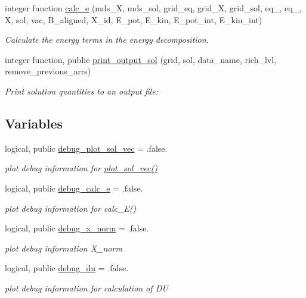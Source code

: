 \begin{DoxyCompactItemize}
integer function \hyperlink{namespacesol__ops_ae094c2a5235324b4aadb53623978d191}{calc\+\_\+e} (mds\+\_\+X, mds\+\_\+sol, grid\+\_\+eq, grid\+\_\+X, grid\+\_\+sol, eq\+\_, eq\+\_, X, sol, vac, B\+\_\+aligned, X\+\_\+id, E\+\_\+pot, E\+\_\+kin, E\+\_\+pot\+\_\+int, E\+\_\+kin\+\_\+int)
\begin{DoxyCompactList}\small\item\em Calculate the energy terms in the energy decomposition. \end{DoxyCompactList}\item 
integer function, public \hyperlink{namespacesol__ops_a06eb95d55da45ff2a1f830a380e0cf80}{print\+\_\+output\+\_\+sol} (grid, sol, data\+\_\+name, rich\+\_\+lvl, remove\+\_\+previous\+\_\+arrs)
\begin{DoxyCompactList}\small\item\em Print solution quantities to an output file\+: \end{DoxyCompactList}\end{DoxyCompactItemize}
\subsection*{Variables}
\begin{DoxyCompactItemize}
\item 
logical, public \hyperlink{namespacesol__ops_ae0df0d66ef4ea0155cfbeb23973c28ac}{debug\+\_\+plot\+\_\+sol\+\_\+vec} = .false.
\begin{DoxyCompactList}\small\item\em plot debug information for \hyperlink{namespacesol__ops_a13b3cf2fb6437a3c93256368fa91c267}{plot\+\_\+sol\+\_\+vec()} \end{DoxyCompactList}\item 
logical, public \hyperlink{namespacesol__ops_a4dc364bc6b70b805abdc3ed0ab2e5226}{debug\+\_\+calc\+\_\+e} = .false.
\begin{DoxyCompactList}\small\item\em plot debug information for calc\+\_\+\+E() \end{DoxyCompactList}\item 
logical, public \hyperlink{namespacesol__ops_a718171b8636e5e4ad98fd4e35ca5b71f}{debug\+\_\+x\+\_\+norm} = .false.
\begin{DoxyCompactList}\small\item\em plot debug information {\ttfamily X\+\_\+norm} \end{DoxyCompactList}\item 
logical, public \hyperlink{namespacesol__ops_acb6465b87495933920896a52b4298a4c}{debug\+\_\+du} = .false.
\begin{DoxyCompactList}\small\item\em plot debug information for calculation of {\ttfamily DU} \end{DoxyCompactList}\end{DoxyCompactItemize}


